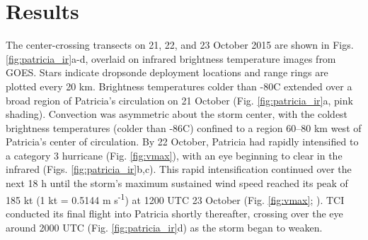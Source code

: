 \section{Results}

The center-crossing transects on 21, 22, and 23 October 2015 are shown in Figs. \ref{fig:patricia_ir}a-d, overlaid on infrared brightness temperature images from GOES.
Stars indicate dropsonde deployment locations and range rings are plotted every 20 km.
Brightness temperatures colder than -80\textdegree{}C extended over a broad region of Patricia’s circulation on 21 October (Fig. \ref{fig:patricia_ir}a, pink shading).
Convection was asymmetric about the storm center, with the coldest brightness temperatures (colder than -86\textdegree{}C) confined to a region 60–80 km west of Patricia’s center of circulation.
By 22 October, Patricia had rapidly intensified to a category 3 hurricane (Fig. \ref{fig:vmax}), with an eye beginning to clear in the infrared (Figs. \ref{fig:patricia_ir}b,c).
This rapid intensification continued over the next 18 h until the storm’s maximum sustained wind speed reached its peak
of 185 kt (1 kt = 0.5144 m s\textsuperscript{-1}) at 1200 UTC 23 October (Fig. \ref{fig:vmax}; \citeauthor{Kimberlainetal2016} \citeyear{Kimberlainetal2016}).
TCI conducted its final flight into Patricia shortly thereafter, crossing over the eye around 2000 UTC (Fig. \ref{fig:patricia_ir}d) as the storm began to weaken.

